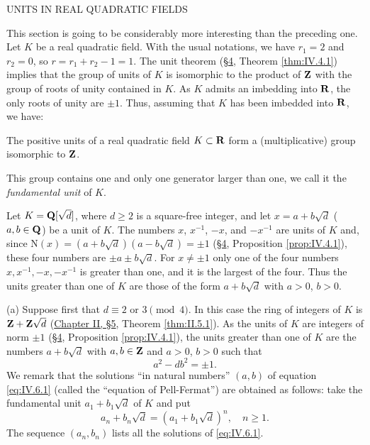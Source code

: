 %
        {UNITS IN REAL QUADRATIC FIELDS}

This section is going to be considerably more interesting than the
preceding one. Let $K$ be a real quadratic field. With the usual notations,
we have $r_{1}=2$ and $r_{2}=0$, so $r=r_{1}+r_{2}-1=1$. The unit theorem
(\hyperref[sec:4.4]{§4}, Theorem \ref{thm:IV.4.1}) implies that the group of units of $K$ is
isomorphic to the product of $\mathbf{Z}$ with the group of roots of unity contained
in $K$. As $K$ admits an imbedding into $\mathbf{R}$, the only roots of unity are
$\pm1$. Thus, assuming that $K$ has been imbedded into $\mathbf{R}$, we have:

\begin{proposition}
\label{prop:IV.6.1}
The positive units of a real quadratic field $K\subset\mathbf{R}$ form a
(multiplicative) group isomorphic to $\mathbf{Z}$.
\end{proposition}

This group contains one and only one generator larger than one, we call it
the \emph{fundamental unit} of $K$.

Let $K=\mathbf{Q}[\sqrt{d}]$, where $d\geq2$ is a square-free integer, and let
$x=a+b\sqrt{d}$ ($a,b\in\mathbf{Q}$) be a unit of $K$. The numbers $x$, $x^{-1}$,
$-x$, and $-x^{-1}$ are units of $K$ and, since
$\mathrm{N}(x)=(a+b\sqrt{d})(a-b\sqrt{d})=\pm1$ (\hyperref[sec:4.4]{§4}, Proposition
\ref{prop:IV.4.1}), these four numbers are $\pm a\pm b\sqrt{d}$. For
$x\neq\pm1$ only one of the four numbers $x,x^{-1},-x,-x^{-1}$ is greater
than one, and it is the largest of the four. Thus the units greater than one
of $K$ are those of the form $a+b\sqrt{d}$ with $a>0$, $b>0$.

(a) Suppose first that $d\equiv2$ or $3\pmod{4}$. In this case the ring of
integers of $K$ is $\mathbf{Z}+\mathbf{Z}\sqrt{d}$ (\hyperref[sec:2.5]{Chapter II, §5}, Theorem
\ref{thm:II.5.1}). As the units of $K$ are integers of norm $\pm1$
(\hyperref[sec:4.4]{§4}, Proposition \ref{prop:IV.4.1}), the units greater than one of $K$ are
the numbers $a+b\sqrt{d}$ with $a,b\in\mathbf{Z}$ and $a>0$, $b>0$ such that
\begin{equation}
a^{2}-db^{2}=\pm1.
\label{eq:IV.6.1}
\end{equation}
We remark that the solutions ``in natural numbers'' $(a,b)$ of equation
\eqref{eq:IV.6.1} (called the ``equation of Pell-Fermat'') are obtained as
follows: take the fundamental unit $a_{1}+b_{1}\sqrt{d}$ of $K$ and put
\begin{equation}
a_{n}+b_{n}\sqrt{d}=(a_{1}+b_{1}\sqrt{d})^{n},\quad n\geq1.
\label{eq:IV.6.2}
\end{equation}
The sequence $(a_{n},b_{n})$ lists all the solutions of \eqref{eq:IV.6.1}.

